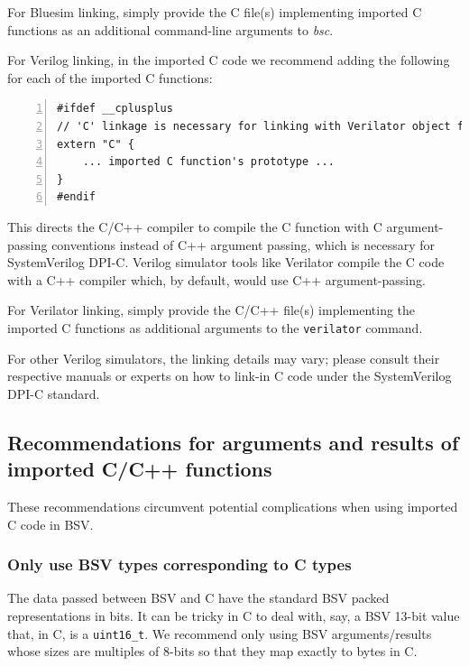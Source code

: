 For Bluesim linking, simply provide the C file(s) implementing
imported C functions as an additional command-line arguments to
\emph{bsc}.

For Verilog linking, in the imported C code we recommend adding the
following for each of the imported C functions:

{\small
\begin{Verbatim}[frame=single, numbers=left]
#ifdef __cplusplus
// 'C' linkage is necessary for linking with Verilator object files
extern "C" {
    ... imported C function's prototype ...
}
#endif
\end{Verbatim}
}

This directs the C/C++ compiler to compile the C function with C
argument-passing conventions instead of C++ argument passing, which is
necessary for SystemVerilog DPI-C.  Verilog simulator tools like
Verilator compile the C code with a C++ compiler which, by default,
would use C++ argument-passing.

For Verilator linking, simply provide the C/C++ file(s) implementing
the imported C functions as additional arguments to the
\verb|verilator| command.

For other Verilog simulators, the linking details may vary; please
consult their respective manuals or experts on how to link-in C code
under the SystemVerilog DPI-C standard.


\subsection{Recommendations for arguments and results of imported C/C++ functions}

These recommendations circumvent potential complications when using
imported C code in BSV.


\subsubsection{Only use BSV types corresponding to C types}

The data passed between BSV and C have the standard BSV packed
representations in bits.  It can be tricky in C to deal with, say, a
BSV 13-bit value that, in C, is a \verb|uint16_t|.  We recommend only
using BSV arguments/results whose sizes are multiples of 8-bits so
that they map exactly to bytes in C.

